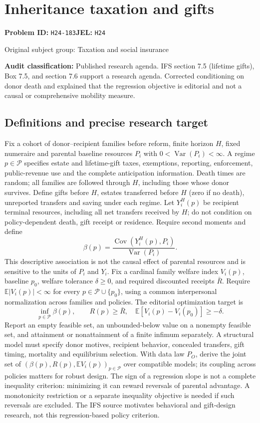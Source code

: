 \documentclass[11pt,a4paper]{article}
\begin{document}
\section*{Inheritance taxation and gifts}
\textbf{Problem ID:} \texttt{H24-183}\quad \textbf{JEL:} \texttt{H24}\par
\label{problem:OP-0473}
{\sffamily\small\color{muted}Original subject group: Taxation and social insurance\par}
\label{definitions:problem:30007755}
\textbf{Audit classification:} Published research agenda. IFS section 7.5 (lifetime gifts), Box 7.5, and section 7.6 support a research agenda. Corrected conditioning on donor death and explained that the regression objective is editorial and not a causal or comprehensive mobility measure.
\subsection*{Definitions and precise research target}
Fix a cohort of donor--recipient families before reform, finite horizon \(H\), fixed numeraire and parental baseline resources \(P_i\) with \(0<\operatorname{Var}(P_i)<\infty\). A regime \(p\in\mathcal P\) specifies estate and lifetime-gift taxes, exemptions, reporting, enforcement, public-revenue use and the complete anticipation information. Death times are random; all families are followed through \(H\), including those whose donor survives. Define gifts before \(H\), estates transferred before \(H\) (zero if no death), unreported transfers and saving under each regime. Let \(Y_i^H(p)\) be recipient terminal resources, including all net transfers received by \(H\); do not condition on policy-dependent death, gift receipt or residence. Require second moments and define
\[
 \beta(p)=\frac{\operatorname{Cov}(Y_i^H(p),P_i)}{\operatorname{Var}(P_i)}.
\]
This descriptive association is not the causal effect of parental resources and is sensitive to the units of \(P_i\) and \(Y_i\). Fix a cardinal family welfare index \(V_i(p)\), baseline \(p_0\), welfare tolerance \(\delta\geq0\), and required discounted receipts \(\bar R\). Require \(\mathbb E|V_i(p)|<\infty\) for every \(p\in\mathcal P\cup\{p_0\}\), using a common interpersonal normalization across families and policies. The editorial optimization target is
\[
 \inf_{p\in\mathcal P}\beta(p),\qquad
 R(p)\geq\bar R,\quad \mathbb E[V_i(p)-V_i(p_0)]\geq-\delta.
\]
Report an empty feasible set, an unbounded-below value on a nonempty feasible set, and attainment or nonattainment of a finite infimum separately. A structural model must specify donor motives, recipient behavior, concealed transfers, gift timing, mortality and equilibrium selection. With data law \(P_O\), derive the joint set of \((\beta(p),R(p),\mathbb EV_i(p))_{p\in\mathcal P}\) over compatible models; its coupling across policies matters for robust design. The sign of a regression slope is not a complete inequality criterion: minimizing it can reward reversals of parental advantage. A monotonicity restriction or a separate inequality objective is needed if such reversals are excluded. The IFS source motivates behavioral and gift-design research, not this regression-based policy criterion.
\end{document}
